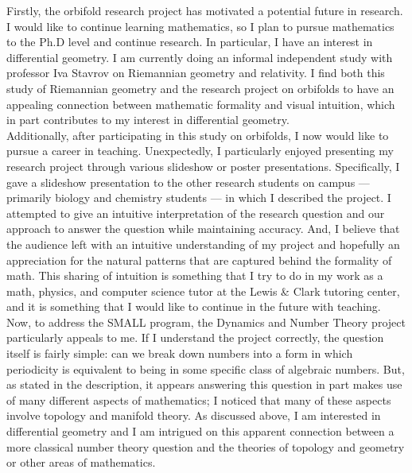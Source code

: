 \documentclass[12pt]{amsart}
\begin{document}
    Firstly, the orbifold research project has motivated a potential future
    in research. I would like to continue learning mathematics, so I plan
    to pursue mathematics to the Ph.D level and continue research. In
    particular, I have an interest in differential geometry. I am currently
    doing an informal independent study with professor Iva Stavrov on
    Riemannian geometry and relativity. I find both this study of
    Riemannian geometry and the research project on orbifolds to have an
    appealing connection between mathematic formality and visual intuition,
    which in part contributes to my interest in differential geometry.\\

    Additionally, after participating in this study on orbifolds, I now
    would like to pursue a career in teaching. Unexpectedly, I particularly
    enjoyed presenting my research project through various slideshow or
    poster presentations. Specifically, I gave a slideshow presentation to
    the other research students on campus --- primarily biology and
    chemistry students --- in which I described the project. I attempted to
    give an intuitive interpretation of the research question and our
    approach to answer the question while maintaining accuracy. And, I
    believe that the audience left with an intuitive understanding of my
    project and hopefully an appreciation for the natural patterns that are
    captured behind the formality of math. This sharing of intuition is
    something that I try to do in my work as a math, physics, and computer
    science tutor at the Lewis \& Clark tutoring center, and it is something
    that I would like to continue in the future with teaching.\\

Now, to address the SMALL program, the Dynamics and Number Theory project
particularly appeals to me. If I understand the project correctly, the
question itself is fairly simple: can we break down numbers into a form in
which periodicity is equivalent to being in some specific class of
algebraic numbers. But, as stated in the description, it appears answering
this question in part makes use of many different aspects of mathematics; I
noticed that many of these aspects involve topology and manifold theory. As
discussed above, I am interested in differential geometry and I am
intrigued on this apparent connection between a more classical number
theory question and the theories of topology and geometry or other areas of
mathematics.\\
\end{document}

